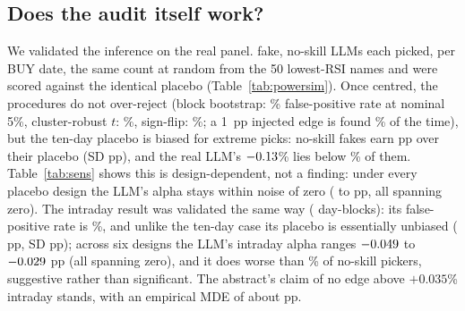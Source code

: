 \documentclass[conference]{IEEEtran}
\newcommand{\pct}[1]{$#1$\%}
\begin{document}
\subsection{Does the audit itself work?}\label{sec:valid}
We validated the inference on the real panel. \powSets{} fake, no-skill LLMs each picked, per BUY date, the same count at random from the 50 lowest-RSI names and were scored against the identical placebo (Table~\ref{tab:powersim}). Once centred, the procedures do not over-reject (block bootstrap: \powSizeBoot\% false-positive rate at nominal 5\%, cluster-robust $t$: \powSizeT\%, sign-flip: \powSizePerm\%; a 1~pp injected edge is found \powPwrOne\% of the time), but the ten-day placebo is biased for extreme picks: no-skill fakes earn \powBias{} pp over their placebo (SD \powSD{} pp), and the real LLM's \pct{\mBuyMinusMatch} lies below \powRealPct\% of them. Table~\ref{tab:sens} shows this is design-dependent, not a finding: under every placebo design the LLM's alpha stays within noise of zero (\sensLo{} to \sensHi{} pp, all spanning zero). The intraday result was validated the same way (\ipBlocks{} day-blocks): its false-positive rate is \ipSizeBoot\%, and unlike the ten-day case its placebo is essentially unbiased (\ipBias{} pp, SD \ipSD{} pp); across six designs the LLM's intraday alpha ranges $-0.049$ to $-0.029$ pp (all spanning zero), and it does worse than \ipWorseBase\% of no-skill pickers, suggestive rather than significant. The abstract's claim of no edge above $+0.035$\% intraday stands, with an empirical MDE of about \ipMDE{} pp.

\begin{table}[t]
\centering
\caption{Monte-Carlo check of the inference (\%): share of no-skill fake LLMs (\powSets{} ten-day, 300 intraday) reporting an edge, after centring, as a true edge $\delta$ is added ($\delta_0{=}0$: false-positive rate, nominal 5\%). $\delta$ (pp): ten-day 0/0.5/1.0/1.5/2.0; intraday 0/0.03/0.05/0.08/0.12.}
\label{tab:powersim}
\footnotesize\setlength{\tabcolsep}{2pt}
\end{table}
\end{document}
